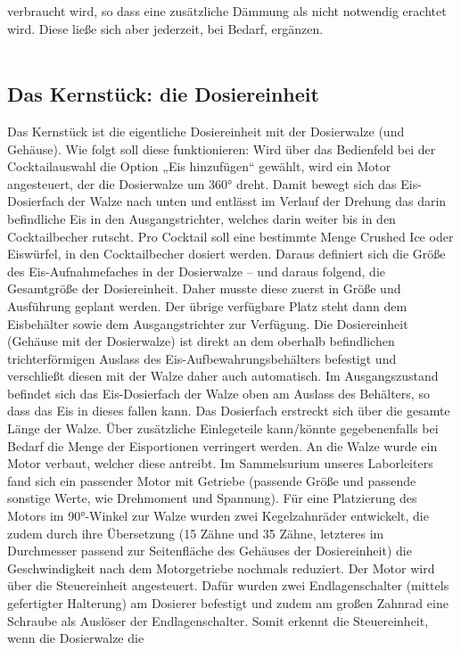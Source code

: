\documentclass[10pt,a4paper]{report}
\begin{document}
	verbraucht wird, so dass eine zusätzliche Dämmung als nicht notwendig erachtet wird. Diese
	ließe sich aber jederzeit, bei Bedarf, ergänzen.\\\\
	
	\subsection{Das Kernstück: die Dosiereinheit}
	Das Kernstück ist die eigentliche Dosiereinheit mit der Dosierwalze (und Gehäuse).
	Wie folgt soll diese funktionieren: Wird über das Bedienfeld bei der Cocktailauswahl die Option
	„Eis hinzufügen“ gewählt, wird ein Motor angesteuert, der die Dosierwalze um 360° dreht. Damit
	bewegt sich das Eis-Dosierfach der Walze nach unten und entlässt im Verlauf der Drehung das
	darin befindliche Eis in den Ausgangstrichter, welches darin weiter bis in den Cocktailbecher
	rutscht.
	Pro Cocktail soll eine bestimmte Menge Crushed Ice oder Eiswürfel, in den Cocktailbecher
	dosiert werden. Daraus definiert sich die Größe des Eis-Aufnahmefaches in der Dosierwalze –
	und daraus folgend, die Gesamtgröße der Dosiereinheit.
	Daher musste diese zuerst in Größe und Ausführung geplant werden. Der übrige verfügbare
	Platz steht dann dem Eisbehälter sowie dem Ausgangstrichter zur Verfügung.
	Die Dosiereinheit (Gehäuse mit der Dosierwalze) ist direkt an dem oberhalb befindlichen
	trichterförmigen Auslass des Eis-Aufbewahrungsbehälters befestigt und verschließt diesen mit
	der Walze daher auch automatisch. Im Ausgangszustand befindet sich das Eis-Dosierfach der
	Walze oben am Auslass des Behälters, so dass das Eis in dieses fallen kann. Das Dosierfach
	erstreckt sich über die gesamte Länge der Walze. Über zusätzliche Einlegeteile kann/könnte
	gegebenenfalls bei Bedarf die Menge der Eisportionen verringert werden.
	An die Walze wurde ein Motor verbaut, welcher diese antreibt. Im Sammelsurium unseres
	Laborleiters fand sich ein passender Motor mit Getriebe (passende Größe und passende
	sonstige Werte, wie Drehmoment und Spannung).
	Für eine Platzierung des Motors im 90°-Winkel zur Walze wurden zwei Kegelzahnräder
	entwickelt, die zudem durch ihre Übersetzung (15 Zähne und 35 Zähne, letzteres im
	Durchmesser passend zur Seitenfläche des Gehäuses der Dosiereinheit) die Geschwindigkeit
	nach dem Motorgetriebe nochmals reduziert.
	Der Motor wird über die Steuereinheit angesteuert. Dafür wurden zwei Endlagenschalter (mittels
	gefertigter Halterung) am Dosierer befestigt und zudem am großen Zahnrad eine Schraube als
	Auslöser der Endlagenschalter. Somit erkennt die Steuereinheit, wenn die Dosierwalze die
\end{document}
